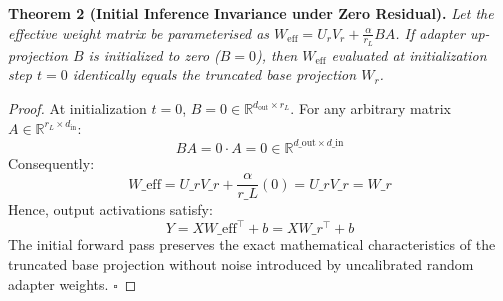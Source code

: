 \textbf{Theorem 2 (Initial Inference Invariance under Zero Residual).} \textit{Let the effective weight matrix be parameterised as $W_{\text{eff}} = U_r V_r + \frac{\alpha}{r_L} B A$. If adapter up-projection $B$ is initialized to zero ($B = 0$), then $W_{\text{eff}}$ evaluated at initialization step $t=0$ identically equals the truncated base projection $W_r$.}

\begin{proof}
At initialization $t=0$, $B = 0 \in \mathbb{R}^{d_{\text{out}} \times r_L}$. For any arbitrary matrix $A \in \mathbb{R}^{r_L \times d_{\text{in}}}$:
\[
B A = 0 \cdot A = 0 \in \mathbb{R}^{d\_{\text{out}} \times d\_{\text{in}}}
\]
Consequently:
\[
W\_{\text{eff}} = U\_r V\_r + \frac{\alpha}{r\_L} (0) = U\_r V\_r = W\_r
\]
Hence, output activations satisfy:
\[
Y = X W\_{\text{eff}}^\top + b = X W\_r^\top + b
\]
The initial forward pass preserves the exact mathematical characteristics of the truncated base projection without noise introduced by uncalibrated random adapter weights. $\square$
\end{proof}

